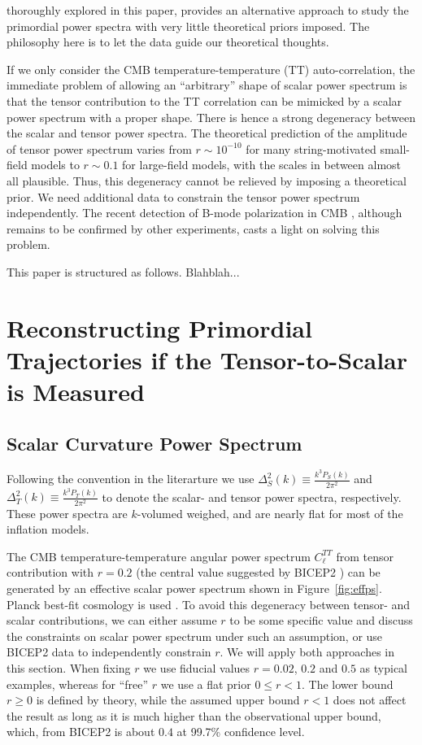 \documentclass[11pt]{article}
\begin{document}
thoroughly explored in this paper, provides an alternative approach to study the primordial power spectra with very little theoretical priors imposed. The philosophy here is to let the data guide our theoretical thoughts.

If we only consider the CMB temperature-temperature (TT) auto-correlation, the immediate problem of allowing an ``arbitrary'' shape of scalar power spectrum is that the tensor contribution to the TT correlation can be mimicked by a scalar power spectrum with a proper shape. There is hence a strong degeneracy between the scalar and tensor power spectra. The theoretical prediction of the amplitude of tensor power spectrum varies from $r\sim 10^{-10}$ for many string-motivated small-field models to  $r\sim 0.1$ for large-field models, with the scales in between almost all plausible. Thus, this degeneracy cannot be relieved by imposing a theoretical prior. We need additional data to constrain the tensor power spectrum independently. The recent detection of B-mode polarization in CMB \cite{BICEP2}, although remains to be confirmed by other experiments, casts a light on solving this problem.

This paper is structured as follows. Blahblah...

\section{Reconstructing Primordial Trajectories if the Tensor-to-Scalar is Measured}

\subsection{Scalar Curvature Power Spectrum }

Following the convention in the literarture we use $\Delta^2_{S}(k) \equiv \frac{k^3P_S(k)}{2\pi^2}$ and $\Delta^2_T(k) \equiv \frac{k^3P_T(k)}{2\pi^2}$ to denote the scalar- and tensor power spectra, respectively. These power spectra are $k$-volumed weighed, and are nearly flat for most of the inflation models.

The CMB temperature-temperature angular power spectrum $C_\ell^{TT}$ from tensor contribution with $r=0.2$ (the central value suggested by BICEP2 \cite{BICEP2}) can be generated by an effective scalar power spectrum shown in Figure~\ref{fig:effps}. Planck best-fit cosmology is used \cite{Planck2013Parameters}.  To avoid this degeneracy between tensor- and scalar contributions, we can either assume $r$ to be some specific value and discuss the constraints on scalar power spectrum under such an assumption, or use BICEP2 data to independently constrain $r$. We will apply both approaches in this section. When fixing $r$ we use fiducial values $r=0.02$,  $0.2$ and $0.5$ as typical examples, whereas for ``free'' $r$ we use a flat prior $0\le r < 1$. The lower bound $r\ge 0$ is defined by theory, while the assumed upper bound $r<1$ does not affect the result as long as it is much higher than the observational upper bound, which, from BICEP2 is about $0.4$ at 99.7\% confidence level.   
\end{document}
